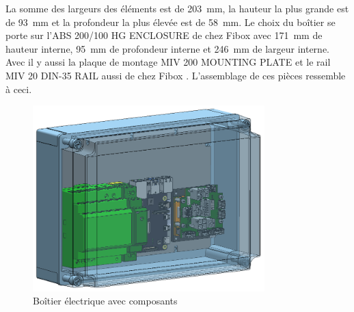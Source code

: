 \begin{table}[H]
  \centering
  \caption{Éléments choisis pour le boîtier électrique}
  \label{tab:ChoixElem}
\end{table}

La somme des largeurs des éléments est de 203~mm, la hauteur la plus grande est de 93~mm et la profondeur la plus élevée est de 58~mm. Le choix
du boîtier se porte sur l'ABS 200/100 HG ENCLOSURE de chez Fibox \cite{Fibox} avec 171~mm de hauteur interne, 95~mm de profondeur interne et
246~mm de largeur interne. Avec il y aussi la plaque de montage MIV 200 MOUNTING PLATE et le rail MIV 20 DIN-35 RAIL aussi de chez Fibox \cite{Fibox}.
L'assemblage de ces pièces ressemble à ceci.

\begin{figure}[H]
  \centering
  \includegraphics[width = 0.8\textwidth]{assets/figures/AssemblageBoitierElectrique.png}
  \caption{Boîtier électrique avec composants}
  \label{fig:AssBoitierElec}
\end{figure}